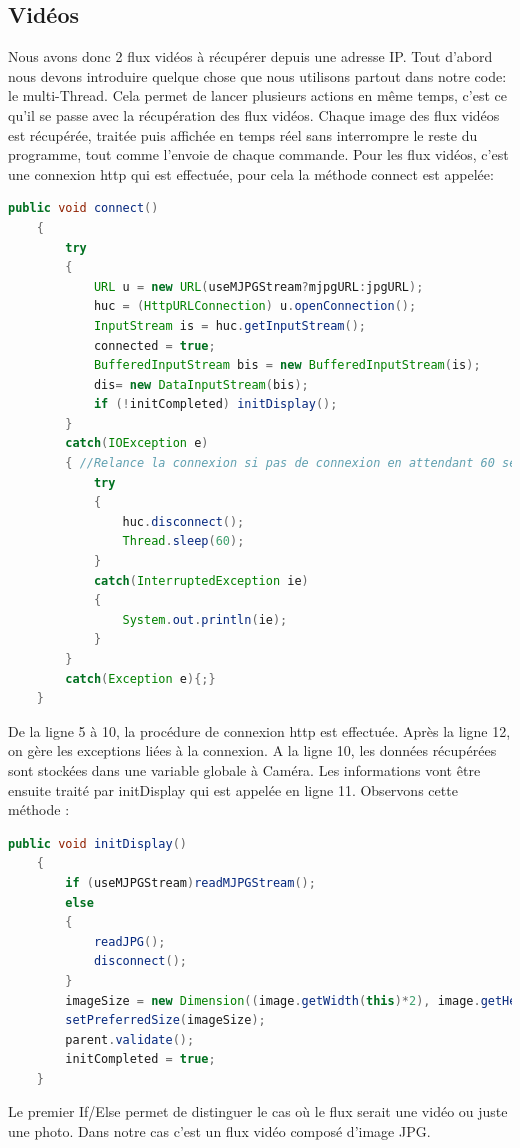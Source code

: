 \documentclass[a4paper,11pt]{report}
\begin{document}
		\subsection{Vidéos}
		Nous avons donc 2 flux vidéos à récupérer depuis une adresse IP. Tout d'abord nous devons introduire quelque chose que nous utilisons partout dans notre code: le multi-Thread. Cela permet de lancer plusieurs actions en même temps, c'est ce qu'il se passe avec la récupération des flux vidéos. Chaque image des flux vidéos est récupérée, traitée puis affichée en temps réel sans interrompre le reste du programme, tout comme l'envoie de chaque commande.
		\newline Pour les flux vidéos, c'est une connexion http qui est effectuée, pour cela la méthode connect est appelée:
		\begin{lstlisting}[language=java]
public void connect()
	{
		try
		{
			URL u = new URL(useMJPGStream?mjpgURL:jpgURL);
			huc = (HttpURLConnection) u.openConnection();
			InputStream is = huc.getInputStream();
			connected = true;
			BufferedInputStream bis = new BufferedInputStream(is);
			dis= new DataInputStream(bis);
			if (!initCompleted) initDisplay();
		}
		catch(IOException e)
		{ //Relance la connexion si pas de connexion en attendant 60 sec
			try
			{
				huc.disconnect();
				Thread.sleep(60);
			}
			catch(InterruptedException ie)
			{
				System.out.println(ie);
			}
		}
		catch(Exception e){;}
	}
			\end{lstlisting}
			De la ligne 5 à 10, la procédure de connexion http est effectuée.
			\newline Après la ligne 12, on gère les exceptions liées à la connexion.
			\newline A la ligne 10, les données récupérées sont stockées dans une variable globale à Caméra.
			\newline Les informations vont être ensuite traité par initDisplay qui est appelée en ligne 11.
			\newline Observons cette méthode :
		\begin{lstlisting}[language=java]
public void initDisplay()
	{ 
		if (useMJPGStream)readMJPGStream();
		else
		{
			readJPG();
			disconnect();
		}
		imageSize = new Dimension((image.getWidth(this)*2), image.getHeight(this)*2);
		setPreferredSize(imageSize);
		parent.validate();
		initCompleted = true;
	}
		\end{lstlisting}
		Le premier If/Else permet de distinguer le cas où le flux serait une vidéo ou juste une photo. Dans notre cas c'est un flux vidéo composé d'image JPG.
\end{document}
